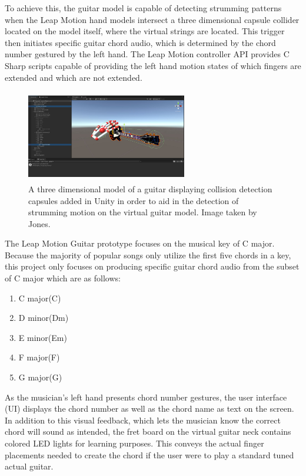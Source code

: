 \documentclass{vgtc}                          %
\begin{document}
To achieve this, the guitar model is capable of detecting strumming patterns when the Leap Motion hand models intersect a three dimensional capsule collider located on the model itself, where the virtual strings are located. This trigger then initiates specific guitar chord audio, which is determined by the chord number gestured by the left hand. The Leap Motion controller API provides C Sharp scripts capable of providing the left hand motion states of which fingers are extended and which are not extended.

\begin{figure}[h]
\centering
\includegraphics[width=7cm, height=4cm]{pictures/Capsule_Collider.JPG}
\centering
\caption{A three dimensional model of a guitar displaying collision detection capsules added in Unity in order to aid in the detection of strumming motion on the virtual guitar model. Image taken by Jones.}
\end{figure}

The Leap Motion Guitar prototype focuses on the musical key of C major. Because the majority of popular songs only utilize the first five chords in a key, this project only focuses on producing specific guitar chord audio from the subset of C major which are as follows:

\begin{enumerate}
  \item C major(C)
  \item D minor(Dm)
  \item E minor(Em)
  \item F major(F)
  \item G major(G)
\end{enumerate}

As the musician's left hand presents chord number gestures, the user interface (UI) displays the chord number as well as the chord name as text on the screen. In addition to this visual feedback, which lets the musician know the correct chord will sound as intended, the fret board on the virtual guitar neck contains colored LED lights for learning purposes. This conveys the actual finger placements needed to create the chord if the user were to play a standard tuned actual guitar.
\end{document}
